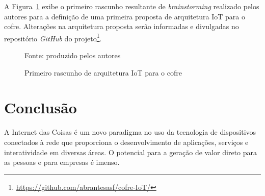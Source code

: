 \documentclass[pdftex, brazil, 12pt, twoside]{article}
\newcommand{\ingles}[1]{\textit{#1}}
\begin{document}
A Figura~\ref{fig:arquitetura-cofre-iot} exibe o primeiro rascunho resultante de \ingles{brainstorming}
realizado pelos autores para a definição de uma primeira proposta de arquitetura IoT
para o cofre. Alterações na arquitetura proposta serão informadas e divulgadas
no repositório \ingles{GitHub} do projeto\footnote{\url{https://github.com/abrantesasf/cofre-IoT/}}.

\begin{figure}[!h]
  \begin{center}
    \caption{Primeiro rascunho de arquitetura IoT para o cofre}
    \label{fig:arquitetura-cofre-iot}
    
    \footnotesize{Fonte: produzido pelos autores}
  \end{center}
\end{figure}


\section{Conclusão}
\label{conclusao}

A Internet das Coisas é um novo paradigma no uso da tecnologia de dispositivos
conectados à rede que proporciona o desenvolvimento de aplicações, serviços e
interatividade em diversas áreas. O potencial para a geração de valor direto para
as pessoas e para empresas é imenso.
\end{document}
